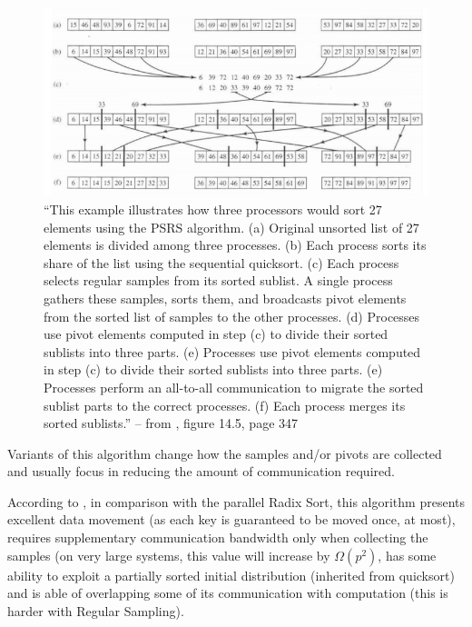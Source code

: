 \documentclass[abstract=on,9pt,twocolumn]{scrartcl}
\begin{document}
\begin{figure}[t]
	\begin{center}
		\includegraphics[width=\textwidth]{images/quinn.png}
	\end{center}
	\caption{``This example illustrates how three processors would sort 27 elements using the PSRS algorithm. (a) Original unsorted list of 27 elements is divided among three processes. (b) Each process sorts its share of the list using the sequential quicksort. (c) Each process selects regular samples from its sorted sublist. A single process gathers these samples, sorts them, and broadcasts pivot elements from the sorted list of samples to the other processes. (d) Processes use pivot elements computed in step (c) to divide their sorted sublists into three parts. (e) Processes use pivot elements computed in step (c) to divide their sorted sublists into three parts. (e) Processes perform an all-to-all communication to migrate the sorted sublist parts to the correct processes. (f) Each process merges its sorted sublists.'' -- from \cite{Quinn2004}, figure 14.5, page 347}
	\label{fig:quinn}
\end{figure}

Variants of this algorithm change how the samples and/or pivots are collected and usually focus in reducing the amount of communication required.

According to \cite{Kale2010}, in comparison with the parallel Radix Sort, this algorithm presents excellent data movement (as each key is guaranteed to be moved once, at most), requires supplementary communication bandwidth only when collecting the samples (on very large systems, this value will increase by $\Omega(p^{2})$, has some ability to exploit a partially sorted initial distribution (inherited from quicksort) and is able of overlapping some of its communication with computation (this is harder with Regular Sampling).
\end{document}

